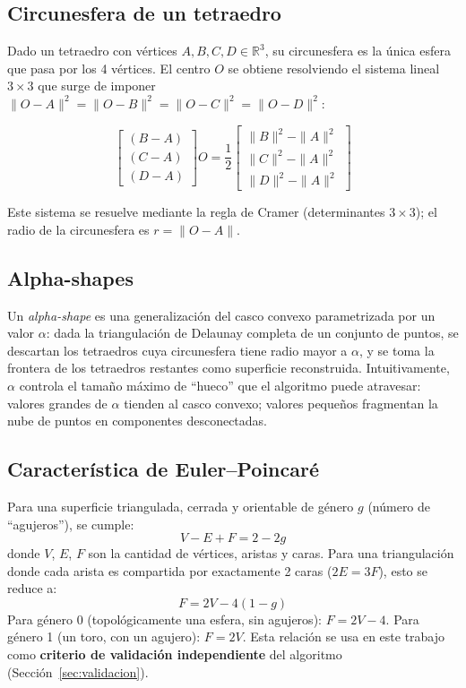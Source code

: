 \documentclass[12pt,a4paper]{article}
\begin{document}
\subsection{Circunesfera de un tetraedro}

Dado un tetraedro con vértices $A, B, C, D \in \mathbb{R}^3$, su
circunesfera es la única esfera que pasa por los 4 vértices. El centro
$O$ se obtiene resolviendo el sistema lineal $3\times3$ que surge de
imponer $\|O-A\|^2 = \|O-B\|^2 = \|O-C\|^2 = \|O-D\|^2$:

\begin{equation}
\begin{bmatrix}
(B-A) \\ (C-A) \\ (D-A)
\end{bmatrix} O
=
\frac{1}{2}
\begin{bmatrix}
\|B\|^2 - \|A\|^2 \\
\|C\|^2 - \|A\|^2 \\
\|D\|^2 - \|A\|^2
\end{bmatrix}
\end{equation}

Este sistema se resuelve mediante la regla de Cramer (determinantes
$3\times3$); el radio de la circunesfera es $r = \|O - A\|$.

\subsection{Alpha-shapes}

Un \emph{alpha-shape} \cite{edelsbrunner1994} es una generalización del
casco convexo parametrizada por un valor $\alpha$: dada la
triangulación de Delaunay completa de un conjunto de puntos, se
descartan los tetraedros cuya circunesfera tiene radio mayor a
$\alpha$, y se toma la frontera de los tetraedros restantes como
superficie reconstruida. Intuitivamente, $\alpha$ controla el tamaño
máximo de ``hueco'' que el algoritmo puede atravesar: valores grandes
de $\alpha$ tienden al casco convexo; valores pequeños fragmentan la
nube de puntos en componentes desconectadas.

\subsection{Característica de Euler--Poincaré}

Para una superficie triangulada, cerrada y orientable de género $g$
(número de ``agujeros''), se cumple:
\begin{equation}
V - E + F = 2 - 2g
\end{equation}
donde $V$, $E$, $F$ son la cantidad de vértices, aristas y caras. Para
una triangulación donde cada arista es compartida por exactamente 2
caras ($2E = 3F$), esto se reduce a:
\begin{equation}
F = 2V - 4(1-g)
\end{equation}
Para género 0 (topológicamente una esfera, sin agujeros): $F = 2V - 4$.
Para género 1 (un toro, con un agujero): $F = 2V$. Esta relación se usa
en este trabajo como \textbf{criterio de validación independiente} del
algoritmo (Sección~\ref{sec:validacion}).
\end{document}
